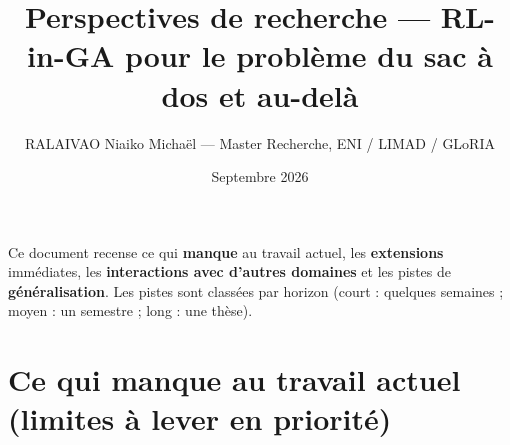\documentclass[
  french,
  11pt,
  a4paper,
]{article}
\title{Perspectives de recherche --- RL-in-GA pour le problème du sac à
dos et au-delà}
\author{RALAIVAO Niaiko Michaël --- Master Recherche, ENI / LIMAD /
GLoRIA}
\date{Septembre 2026}
\begin{document}
\maketitle

{
\setcounter{tocdepth}{3}
\tableofcontents
}
Ce document recense ce qui \textbf{manque} au travail actuel, les
\textbf{extensions} immédiates, les \textbf{interactions avec d'autres
domaines} et les pistes de \textbf{généralisation}. Les pistes sont
classées par horizon (court : quelques semaines ; moyen : un semestre ;
long : une thèse).

\section{Ce qui manque au travail actuel (limites à lever en
priorité)}\label{perspectives-ce-qui-manque-au-travail-actuel-limites-uxe0-lever-en-priorituxe9}
\end{document}
